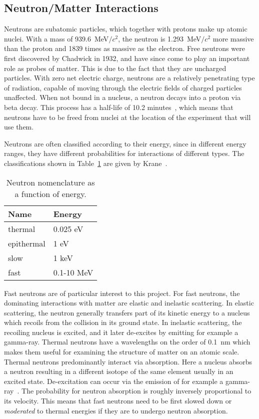 \documentclass[main.tex]{subfiles}
\begin{document}
\subsection{Neutron/Matter Interactions}\label{sec:neutronMatterInteractions}
Neutrons are subatomic particles, which together with protons make up atomic nuclei. With a mass of \SI{939.6}{\MeV}$/c^\textrm{2}$, the neutron is \SI{1.293}{\MeV}$/c^\textrm{2}$ more massive than the proton and 1839 times as massive as the electron. 
Free neutrons were first discovered by Chadwick in 1932, and have since come to play an important role as probes of matter. This is due to the fact that they are uncharged particles. With zero net electric charge, neutrons are a relatively penetrating type of radiation, capable of moving through the electric fields of charged particles unaffected. When not bound in a nucleus, a neutron decays into a proton via beta decay. This process has a half-life of 10.2 minutes~\cite{Nudat}, which means that neutrons have to be freed from nuclei at the location of the experiment that will use them.

Neutrons are often classified according to their energy, since in different energy ranges, they have different probabilities for interactions of different types. The classifications shown in Table~\ref{tab:neutron} are given by Krane~\cite{Krane}. 
\begin{table}[h]
\center
\begin{tabular}{|l|l|}
\hline
Name & Energy \\ \hline
thermal       & 0.025 eV        \\ \hline
epithermal    & 1 eV            \\ \hline
slow          & 1 keV           \\ \hline
fast          & 0.1-10 MeV      \\ \hline
\end{tabular}
\caption[Neutron nomenclature as a function of energy.]{Neutron nomenclature as a function of energy.}
\label{tab:neutron}
\end{table}
Fast neutrons are of particular interest to this project. For fast neutrons, the dominating interactions with matter are elastic and inelastic scattering. In elastic scattering, the neutron generally transfers part of its kinetic energy to a nucleus which recoils from the collision in its ground state. In inelastic scattering, the recoiling nucleus is excited, and it later de-excites by emitting for example a gamma-ray. Thermal neutrons have a wavelengths on the order of \SI{0.1}{nm} which makes them useful for examining the structure of matter on an atomic scale. 
Thermal neutrons predominantly interact via absorption. Here a nucleus absorbs a neutron resulting in a different isotope of the same element usually in an excited state. De-excitation can occur via the emission of for example a gamma-ray~\cite{Leo}. The probability for neutron absorption is roughly inversely proportional to its velocity. This means that fast neutrons need to be first slowed down or \textit{moderated} to thermal energies if they are to undergo neutron absorption. 
\end{document}
